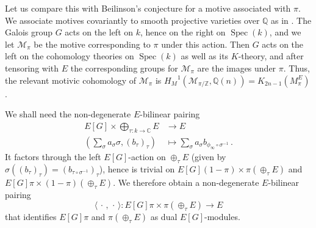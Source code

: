 \documentclass{amsart}
\begin{document}
\begin{remark}
Let us compare this with Beilinson's conjecture for a motive associated with $ \pi $.
We associate motives covariantly to smooth projective varieties over $ {\mathbb Q} $ 
as in \cite[\S~2.4]{bei85}.
The Galois group $ G $ acts on the left on $ k $, hence on the right on $ {\operatorname{Spec}}(k) $, and we let 
$ {\mathcal{M}_\pi} $ be the motive corresponding to $ \pi $ under this action.
Then $ G $ acts on the left on the cohomology theories on $ {\operatorname{Spec}}(k) $
as well as its  $ K $-theory, and after tensoring with $ E $
the corresponding groups for ${\mathcal{M}_\pi}$ are the images under $\pi$.
Thus, the relevant motivic cohomology of ${\mathcal{M}_\pi}$ is ${H_M}^1(\mathcal{M}_{\pi/{\mathbb Z}},{\mathbb Q}(n))= K_{2n-1} (M_\pi^E) $.

We shall need the non-degenerate $ E $-bilinear pairing
\begin{equation*}
\begin{aligned}
E[G] \times \bigoplus_{{\tau}: k \to {\mathbb C}} E & \to E
\\
({\textstyle\sum}_{\sigma} a_{\sigma} {\sigma},  (b_{\tau})_{\tau} ) & \mapsto {\textstyle\sum}_{\sigma} a_{\sigma} b_{\phi_\infty\circ{\sigma}^{-1}}
\,.
\end{aligned}
\end{equation*}
It factors through the left $ E[G] $-action on $ \oplus_{\tau} E $
(given by $ {\sigma}((b_{\tau})_{\tau}) = (b_{{\tau}\circ{\sigma}^{-1}})_{\tau} $),
hence is trivial on $ E[G](1-\pi)\times \pi(\oplus_{\tau} E) $
and $ E[G]\pi\times (1-\pi)(\oplus_{\tau} E) $.
We therefore obtain a non-degenerate $ E $-bilinear pairing
\begin{equation}\label{<>}
\langle \,\cdot\, , \,\cdot\, \rangle : E[G]\pi \times \pi(\oplus_{\tau} E) \to E
\end{equation} 
that identifies $ E[G]\pi $ and $ \pi(\oplus_{\tau} E) $ as dual $ E[G] $-modules.


\end{remark}
\end{document}
